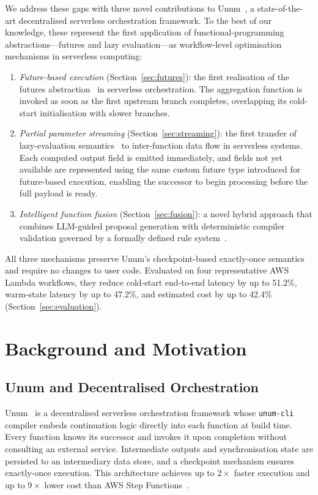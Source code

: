 \documentclass[runningheads]{llncs}
\begin{document}
We address these gaps with three novel contributions to Unum~\cite{285171}, a state-of-the-art decentralised serverless orchestration framework. To the best of our knowledge, these represent the first application of functional-programming abstractions---futures and lazy evaluation---as workflow-level optimisation mechanisms in serverless computing:
\begin{enumerate}\setlength{\itemsep}{1pt}
\item \emph{Future-based execution} (Section~\ref{sec:futures}): the first realisation of the futures abstraction~\cite{baker1977incremental,halstead1985multilisp} in serverless orchestration. The aggregation function is invoked as soon as the first upstream branch completes, overlapping its cold-start initialisation with slower branches.
\item \emph{Partial parameter streaming} (Section~\ref{sec:streaming}): the first transfer of lazy-evaluation semantics~\cite{hughes1989why} to inter-function data flow in serverless systems. Each computed output field is emitted immediately, and fields not yet available are represented using the same custom future type introduced for future-based execution, enabling the successor to begin processing before the full payload is ready.
\item \emph{Intelligent function fusion} (Section~\ref{sec:fusion}): a novel hybrid approach that combines LLM-guided proposal generation with deterministic compiler validation governed by a formally defined rule system~\cite{wurz2020migrating}.
\end{enumerate}
All three mechanisms preserve Unum's checkpoint-based exactly-once semantics and require no changes to user code. Evaluated on four representative AWS Lambda workflows, they reduce cold-start end-to-end latency by up to 51.2\%, warm-state latency by up to 47.2\%, and estimated cost by up to 42.4\% (Section~\ref{sec:evaluation}).


\section{Background and Motivation}
\label{sec:background}

\subsection{Unum and Decentralised Orchestration}

Unum~\cite{285171} is a decentralised serverless orchestration framework whose \texttt{unum-cli} compiler embeds continuation logic directly into each function at build time. Every function knows its successor and invokes it upon completion without consulting an external service. Intermediate outputs and synchronisation state are persisted to an intermediary data store, and a checkpoint mechanism ensures exactly-once execution. This architecture achieves up to $2\times$ faster execution and up to $9\times$ lower cost than AWS Step Functions~\cite{285171}.
\end{document}
